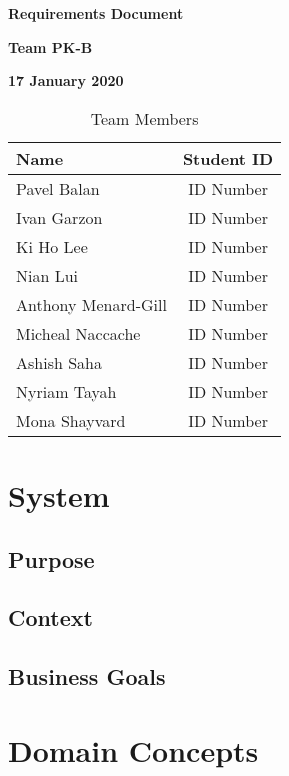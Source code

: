 \documentclass[12pt]{article}
\begin{document}
\vspace*{0.5in}
\centerline{\bf\Large Requirements Document}

\vspace*{0.5in}
\centerline{\bf\Large Team PK-B}

\vspace*{0.5in}
\centerline{\bf\Large 17 January 2020}

\vspace*{1.5in}
\begin{table}[htbp]
\caption{Team Members}
\begin{center}
\begin{tabular}{|l | c|}
\hline
Name & Student ID \\
\hline\hline
Pavel Balan & ID Number \\ \hline
Ivan Garzon & ID Number \\ \hline
Ki Ho Lee & ID Number \\ \hline
Nian Lui & ID Number \\ \hline
Anthony Menard-Gill & ID Number \\ \hline
Micheal Naccache & ID Number \\ \hline
Ashish Saha & ID Number \\ \hline
Nyriam Tayah & ID Number \\ \hline
Mona Shayvard & ID Number \\ \hline
\end{tabular}
\end{center}
\end{table}

\clearpage

\section{System}

\subsection{Purpose}

\subsection{Context}

\subsection{Business Goals}

\section{Domain Concepts}
\end{document}
